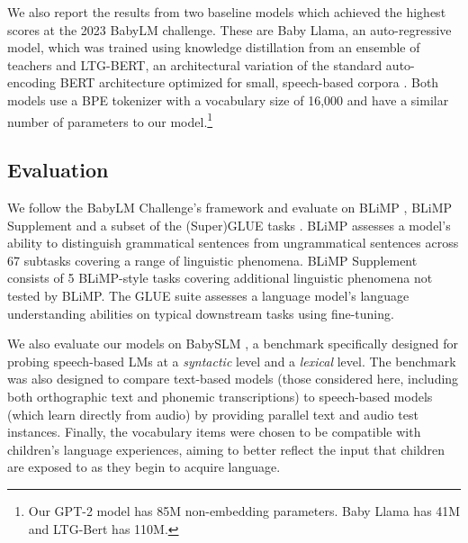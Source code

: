 We also report the results from two baseline models which achieved the highest scores at the 2023 BabyLM challenge. These are Baby Llama, an auto-regressive model, which was trained using knowledge distillation from an ensemble of teachers \citep{timiryasov-tastet-2023-baby} and LTG-BERT, an architectural variation of the standard auto-encoding BERT architecture optimized for small, speech-based corpora \citep{samuel-etal-2023-trained, charpentier-samuel-2023-layers}. Both models use a BPE tokenizer with a vocabulary size of 16,000 and have a similar number of parameters to our model.\footnote{Our GPT-2 model has 85M non-embedding parameters. Baby Llama has 41M and LTG-Bert has 110M.}  

\subsection{Evaluation}
\label{sec:14-evaluation}

We follow the BabyLM Challenge's framework and evaluate on BLiMP \citep{warstadt-etal-2020-blimp-benchmark}, BLiMP Supplement \citep{choshen-et-al-2024-callforpapers-babylm2} and a subset of the (Super)GLUE tasks \citep{wang-etal-2018-glue, wang-etal-2019-superglue}. BLiMP assesses a model's ability to distinguish grammatical sentences from ungrammatical sentences across 67 subtasks covering a range of linguistic phenomena. BLiMP Supplement consists of 5 BLiMP-style tasks covering additional linguistic phenomena not tested by BLiMP. The GLUE suite assesses a language model's language understanding abilities on typical downstream tasks using fine-tuning. 



We also evaluate our models on BabySLM \citep{lavechin}, a benchmark specifically designed for probing speech-based LMs at a \emph{syntactic} level and a \emph{lexical} level. The benchmark was also designed to compare text-based models (those considered here, including both orthographic text and phonemic transcriptions) to speech-based models (which learn directly from audio) by providing parallel text and audio test instances. Finally, the vocabulary items were chosen to be compatible with children’s language experiences, aiming to better reflect the input that children are exposed to as they begin to acquire language. 

